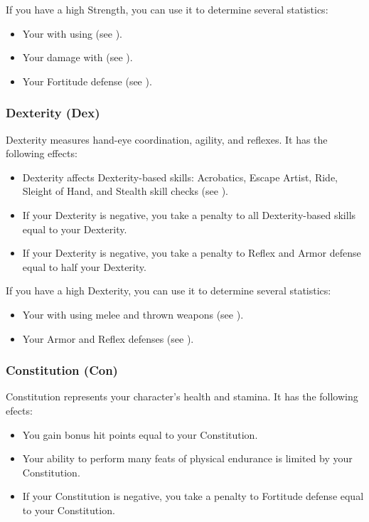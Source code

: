             If you have a high Strength, you can use it to determine several statistics:
            \begin{itemize}
                \item Your  with  using  (see ).
                \item Your damage with  (see ).
                \item Your Fortitude defense (see ).
            \end{itemize}

        \subsubsection{Dexterity (Dex)}\label{Dexterity}
            Dexterity measures hand-eye coordination, agility, and reflexes.
            It has the following effects:
            \begin{itemize}
                \item Dexterity affects Dexterity-based skills: Acrobatics, Escape Artist, Ride, Sleight of Hand, and Stealth skill checks (see ).
                \item If your Dexterity is negative, you take a penalty to all Dexterity-based skills equal to your Dexterity.
                \item If your Dexterity is negative, you take a penalty to Reflex and Armor defense equal to half your Dexterity.
            \end{itemize}

            If you have a high Dexterity, you can use it to determine several statistics:
            \begin{itemize}
                \item Your  with  using melee and thrown weapons (see ).
                \item Your Armor and Reflex defenses (see ).
            \end{itemize}

        \subsubsection{Constitution (Con)}\label{Constitution}
            Constitution represents your character's health and stamina.
            It has the following efects:
            \begin{itemize}
                \item You gain bonus hit points equal to your Constitution.
                \item Your ability to perform many feats of physical endurance is limited by your Constitution.
                \item If your Constitution is negative, you take a penalty to Fortitude defense equal to your Constitution.
            \end{itemize}

